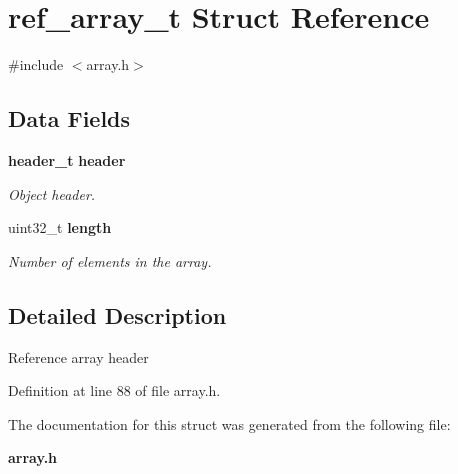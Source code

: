 \section{ref\_\-array\_\-t Struct Reference}
\label{structref__array__t}


{\ttfamily \#include $<$array.h$>$}

\subsection*{Data Fields}
\begin{DoxyCompactItemize}
\item 
{\bf header\_\-t} {\bf header}\label{structref__array__t_a8ea28089d47cd708efb25e0b700233ca}

\begin{DoxyCompactList}\small\item\em Object header. \item\end{DoxyCompactList}\item 
uint32\_\-t {\bf length}\label{structref__array__t_aaa4dfd5c51fadb902130c1728b1f7308}

\begin{DoxyCompactList}\small\item\em Number of elements in the array. \item\end{DoxyCompactList}\end{DoxyCompactItemize}


\subsection{Detailed Description}
Reference array header 

Definition at line 88 of file array.h.



The documentation for this struct was generated from the following file:\begin{DoxyCompactItemize}
\item 
{\bf array.h}\end{DoxyCompactItemize}
